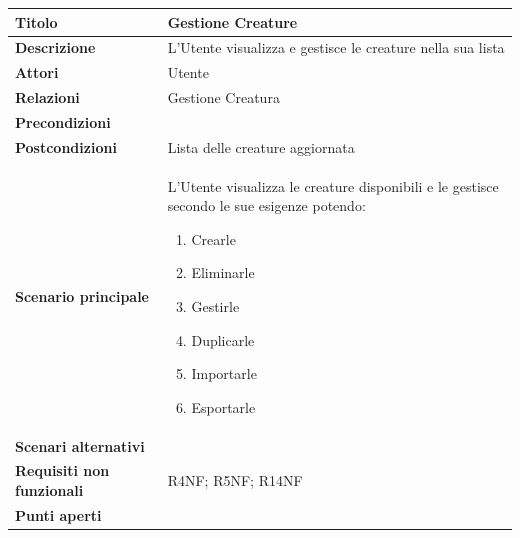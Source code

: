 \documentclass[a4paper, 11pt]{article}
\begin{document}
\begin{center}
\vspace{3em}

\begin{tabular}{ |p{5cm}|p{9.5cm}|  }
\hline
\textbf{Titolo} & Gestione Creature \\
\hline
\textbf{Descrizione} & L'Utente visualizza e gestisce le creature nella sua lista \\
\hline
\textbf{Attori} & Utente  \\
\hline
\textbf{Relazioni} & Gestione Creatura\\
\hline
\textbf{Precondizioni} &  \\
\hline
\textbf{Postcondizioni} & Lista delle creature aggiornata \\
\hline
\textbf{Scenario principale} & L'Utente visualizza le creature disponibili e le gestisce secondo le sue esigenze potendo:
\begin{enumerate}
    \item Crearle
    \item Eliminarle
    \item Gestirle
    \item Duplicarle
    \item Importarle
    \item Esportarle
\end{enumerate} \\
\hline
\textbf{Scenari alternativi} & \\
\hline
\textbf{Requisiti non funzionali} & R4NF; R5NF; R14NF\\
\hline
\textbf{Punti aperti} & \\
\hline
\end{tabular}

\vspace{3em}


\end{center}
\end{document}
